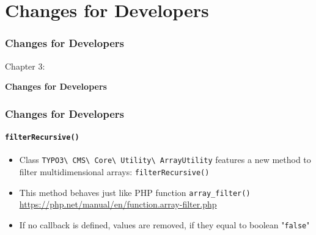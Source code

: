 %

\section{Changes for Developers}
\begin{frame}[fragile]
	\frametitle{Changes for Developers}

	\begin{center}\huge{Chapter 3:}\end{center}
	\begin{center}\huge{\color{typo3darkgrey}\textbf{Changes for Developers}}\end{center}

\end{frame}


\begin{frame}[fragile]
	\frametitle{Changes for Developers}
	\framesubtitle{\texttt{filterRecursive()}}

	\begin{itemize}
		\item Class
			\texttt{TYPO3\textbackslash
				CMS\textbackslash
				Core\textbackslash
				Utility\textbackslash
				ArrayUtility}\newline
			features a new method to filter multidimensional arrays:\newline
			\texttt{filterRecursive()}
		\item This method behaves just like PHP function \texttt{array\_filter()}\newline
			\small
				\href{https://php.net/manual/en/function.array-filter.php}{https://php.net/manual/en/function.array-filter.php}
			\normalsize
		\item If no callback is defined, values are removed, if they equal to boolean "\texttt{false}"
	\end{itemize}

\end{frame}

